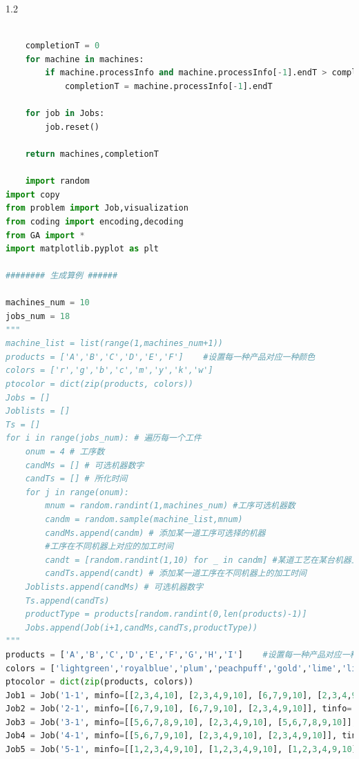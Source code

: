 \documentclass{whutmod}
\begin{document}
\begin{spacing}{1.2}
\begin{lstlisting}[language=python]
 
    completionT = 0
    for machine in machines:
        if machine.processInfo and machine.processInfo[-1].endT > completionT:
            completionT = machine.processInfo[-1].endT

    for job in Jobs:
        job.reset()

    return machines,completionT

    import random
import copy
from problem import Job,visualization
from coding import encoding,decoding
from GA import *
import matplotlib.pyplot as plt

######## 生成算例 ######

machines_num = 10
jobs_num = 18
"""
machine_list = list(range(1,machines_num+1))
products = ['A','B','C','D','E','F']    #设置每一种产品对应一种颜色
colors = ['r','g','b','c','m','y','k','w']
ptocolor = dict(zip(products, colors))
Jobs = []
Joblists = []
Ts = []
for i in range(jobs_num): # 遍历每一个工件
    onum = 4 # 工序数
    candMs = [] # 可选机器数字
    candTs = [] # 所化时间
    for j in range(onum):
        mnum = random.randint(1,machines_num) #工序可选机器数
        candm = random.sample(machine_list,mnum)
        candMs.append(candm) # 添加某一道工序可选择的机器
        #工序在不同机器上对应的加工时间
        candt = [random.randint(1,10) for _ in candm] #某道工艺在某台机器上的时间
        candTs.append(candt) # 添加某一道工序在不同机器上的加工时间
    Joblists.append(candMs) # 可选机器数字
    Ts.append(candTs)
    productType = products[random.randint(0,len(products)-1)]
    Jobs.append(Job(i+1,candMs,candTs,productType))
"""
products = ['A','B','C','D','E','F','G','H','I']    #设置每一种产品对应一种颜色
colors = ['lightgreen','royalblue','plum','peachpuff','gold','lime','lightgrey','pink','deepskyblue']
ptocolor = dict(zip(products, colors))
Job1 = Job('1-1', minfo=[[2,3,4,10], [2,3,4,9,10], [6,7,9,10], [2,3,4,9,10]], tinfo=[[11553,11553,11553,11553], [5769,5769,5769,5769,5769], [4657,4657,4657,4657], [2616,2616,2616,2616,2616]], productType='A')
Job2 = Job('2-1', minfo=[[6,7,9,10], [6,7,9,10], [2,3,4,9,10]], tinfo=[[10380,10380,10380,10380], [14910,14910,14910,14910], [4905,4905,4905,4905,4905]], productType='B')
Job3 = Job('3-1', minfo=[[5,6,7,8,9,10], [2,3,4,9,10], [5,6,7,8,9,10]], tinfo=[[8410,8410,8410,8410,8410,8410], [15855,15855,15855,15855,15855], [3902,3902,3902,3902,3902,3902]], productType='C')
Job4 = Job('4-1', minfo=[[5,6,7,9,10], [2,3,4,9,10], [2,3,4,9,10]], tinfo=[[10370,10370,10370,10370,10370], [15000,15000,15000,15000,15000], [9386,9386,9386,9386,9386]], productType='D')
Job5 = Job('5-1', minfo=[[1,2,3,4,9,10], [1,2,3,4,9,10], [1,2,3,4,9,10], [2,3,4,9,10]], tinfo=[[11655,11655,11655,11655,11655,11655], [7043,7043,7043,7043,7043,7043], [14355,14355,14355,14355,14355,14355], [23410,23410,23410,23410,23410]], productType='E')

\end{lstlisting}
\end{spacing}
\end{document}

